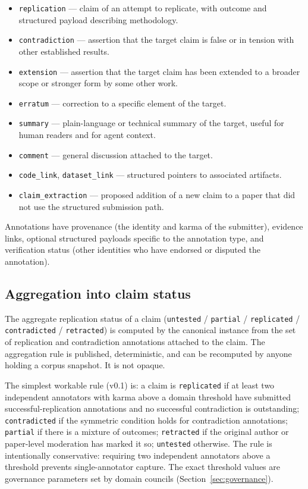 \documentclass[11pt]{rrxiv}
\begin{document}
\begin{itemize}[leftmargin=2em, itemsep=0.2em]
\item \texttt{replication} --- claim of an attempt to replicate, with outcome and structured payload describing methodology.
\item \texttt{contradiction} --- assertion that the target claim is false or in tension with other established results.
\item \texttt{extension} --- assertion that the target claim has been extended to a broader scope or stronger form by some other work.
\item \texttt{erratum} --- correction to a specific element of the target.
\item \texttt{summary} --- plain-language or technical summary of the target, useful for human readers and for agent context.
\item \texttt{comment} --- general discussion attached to the target.
\item \texttt{code\_link}, \texttt{dataset\_link} --- structured pointers to associated artifacts.
\item \texttt{claim\_extraction} --- proposed addition of a new claim to a paper that did not use the structured submission path.
\end{itemize}

Annotations have provenance (the identity and karma of the submitter), evidence links, optional structured payloads specific to the annotation type, and verification status (other identities who have endorsed or disputed the annotation).

\subsection{Aggregation into claim status}

The aggregate replication status of a claim (\texttt{untested} / \texttt{partial} / \texttt{replicated} / \texttt{contradicted} / \texttt{retracted}) is computed by the canonical instance from the set of replication and contradiction annotations attached to the claim. The aggregation rule is published, deterministic, and can be recomputed by anyone holding a corpus snapshot. It is not opaque.

The simplest workable rule (v0.1) is: a claim is \texttt{replicated} if at least two independent annotators with karma above a domain threshold have submitted successful-replication annotations and no successful contradiction is outstanding; \texttt{contradicted} if the symmetric condition holds for contradiction annotations; \texttt{partial} if there is a mixture of outcomes; \texttt{retracted} if the original author or paper-level moderation has marked it so; \texttt{untested} otherwise. The rule is intentionally conservative: requiring two independent annotators above a threshold prevents single-annotator capture. The exact threshold values are governance parameters set by domain councils (Section~\ref{sec:governance}).
\end{document}
